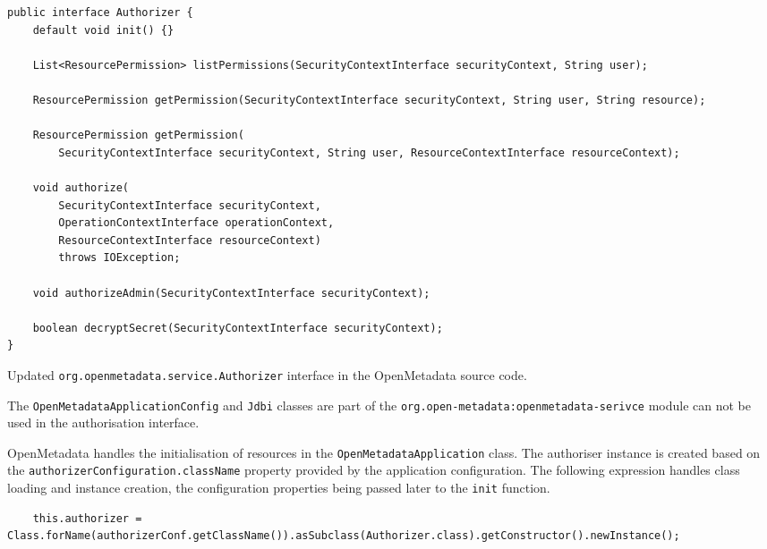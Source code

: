 \begin{listing}[htb!]

\begin{verbatim}
public interface Authorizer {
    default void init() {}

    List<ResourcePermission> listPermissions(SecurityContextInterface securityContext, String user);

    ResourcePermission getPermission(SecurityContextInterface securityContext, String user, String resource);

    ResourcePermission getPermission(
        SecurityContextInterface securityContext, String user, ResourceContextInterface resourceContext);

    void authorize(
        SecurityContextInterface securityContext,
        OperationContextInterface operationContext,
        ResourceContextInterface resourceContext)
        throws IOException;

    void authorizeAdmin(SecurityContextInterface securityContext);

    boolean decryptSecret(SecurityContextInterface securityContext);
}
\end{verbatim}

\caption{Updated \texttt{org.openmetadata.service.Authorizer} interface in the OpenMetadata source code.}
\label{listing:new_authorizer}

\end{listing}

The \texttt{OpenMetadataApplicationConfig} and \texttt{Jdbi} classes are part of the \texttt{org.open-metadata:openmetadata-serivce} module can not be used in the authorisation interface.

OpenMetadata handles the initialisation of resources in the \texttt{OpenMetadataApplication} class. The authoriser instance is created based on the \texttt{authorizerConfiguration.className} property provided by the application configuration. The following expression handles class loading and instance creation, the configuration properties being passed later to the \texttt{init} function.

\begin{verbatim}
    this.authorizer = Class.forName(authorizerConf.getClassName()).asSubclass(Authorizer.class).getConstructor().newInstance();
\end{verbatim}

